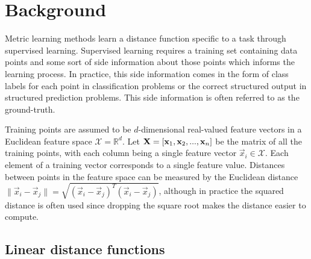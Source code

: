 \chapter{Background}











Metric learning methods learn a distance function specific to a task through supervised learning. Supervised learning requires a training set containing data points and some sort of side information about those points which informs the learning process. In practice, this side information comes in the form of class labels for each point in classification problems or the correct structured output in structured prediction problems. This side information is often referred to as the ground-truth.

Training points are assumed to be $d$-dimensional real-valued feature vectors in a Euclidean feature space $\mathcal{X} = \mathbb{R}^d$. Let $\mathbf{X} = \left[ \mathbf{x}_1, \mathbf{x}_2, ..., \mathbf{x}_n \right]$ be the matrix of all the training points, with each column being a single feature vector $\vec{x}_i \in \mathcal{X}$. Each element of a training vector corresponds to a single feature value. Distances between points in the feature space can be measured by the Euclidean distance $\|\vec{x}_i - \vec{x}_j\| = \sqrt{(\vec{x}_i - \vec{x}_j)^T(\vec{x}_i - \vec{x}_j)}$, although in practice the squared distance is often used since dropping the square root makes the distance easier to compute.



\section{Linear distance functions}

